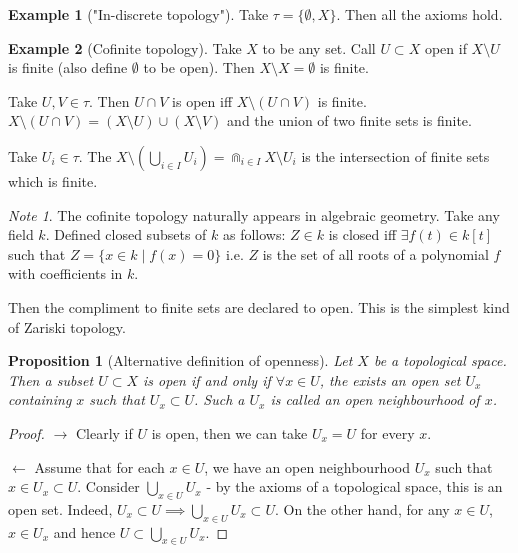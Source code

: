 \documentclass{article}
\theoremstyle{definition}
\newtheorem{exmp}{Example}[section]
\theoremstyle{plain}%
\newtheorem{prop}[thm]{Proposition}
\theoremstyle{remark}
\newtheorem*{note}{Note}
\newcommand{\union}{\cup}
\newcommand{\Union}{\bigcup}
\begin{document}
\begin{exmp}["In-discrete topology"]
Take $\tau = \{\emptyset, X\}$. Then all the axioms hold.
\end{exmp}

\begin{exmp}[Cofinite topology]
Take $X$ to be any set. Call $U \subset X$ open if $X \setminus U$ is finite (also define $\emptyset$ to be open). Then $X \setminus X = \emptyset$ is finite. 

Take $U, V \in \tau$. Then $U \cap V$ is open iff $X \setminus (U \cap V)$ is finite. $X \setminus (U \cap V) = (X \setminus U) \union (X \setminus V)$ and the union of two finite sets is finite.

Take $U_i \in \tau$. The $X \setminus (\Union_{i \in I} U_i) = \Cap_{i \in I} X \setminus U_i$ is the intersection of finite sets which is finite.
\end{exmp}

\begin{note}
The cofinite topology naturally appears in algebraic geometry. Take any field $k$. Defined closed subsets of $k$ as follows: $Z \in k$ is closed iff $\exists f(t) \in k[t]$ such that $Z = \{x \in k \; | \; f(x) = 0\}$ i.e. $Z$ is the set of all roots of a polynomial $f$ with coefficients in $k$.

Then the compliment to finite sets are declared to open. This is the simplest kind of Zariski topology.
\end{note}

\begin{prop}[Alternative definition of openness]\label{open by open neighbourhoods}
Let $X$ be a topological space. Then a subset $U \subset X$ is open if and only if $\forall x \in U$, the exists an open set $U_x$ containing $x$ such that $U_x \subset U$. Such a $U_x$ is called an open neighbourhood of $x$.
\end{prop}

\begin{proof}
$\rightarrow$ Clearly if $U$ is open, then we can take $U_x = U$ for every $x$.

$\leftarrow$ Assume that for each $x \in U$, we have an open neighbourhood $U_x$ such that $x \in U_x \subset U$. Consider $\Union_{x \in U}U_x$ - by the axioms of a topological space, this is an open set. Indeed, $U_x \subset U \implies \Union_{x \in U}U_x \subset U$. On the other hand, for any $x \in U$, $x \in U_x$ and hence $U \subset \Union_{x \in U}U_x$.
\end{proof}
\end{document}
